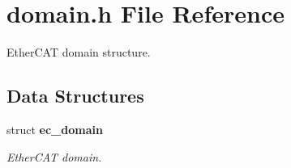 \section{domain.\-h \-File \-Reference}
\label{domain_8h}


\-Ether\-C\-A\-T domain structure.  


\subsection*{\-Data \-Structures}
\begin{DoxyCompactItemize}
\item 
struct {\bf ec\-\_\-domain}
\begin{DoxyCompactList}\small\item\em \-Ether\-C\-A\-T domain. \end{DoxyCompactList}\end{DoxyCompactItemize}
